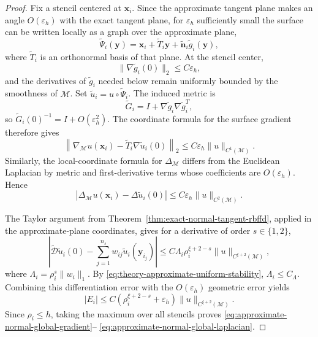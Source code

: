 \documentclass[10pt,a4paper]{amsart}
\begin{document}
\begin{proof}
Fix a stencil centered at \(\bm x_i\).  Since the approximate tangent plane
makes an angle \(O(\varepsilon_h)\) with the exact tangent plane, for
\(\varepsilon_h\) sufficiently small the surface can be written locally as a
graph over the approximate plane,
\[
  \widetilde\Psi_i(\bm y)
  =\bm x_i+\widetilde T_i\bm y
  +\widetilde{\bm n}_i\widetilde g_i(\bm y),
\]
where \(\widetilde T_i\) is an orthonormal basis of that plane.  At the stencil
center,
\[
  \|\nabla\widetilde g_i(0)\|_2\leq C\varepsilon_h,
\]
and the derivatives of \(\widetilde g_i\) needed below remain uniformly
bounded by the smoothness of \(\mathcal M\). Set \(\widetilde u_i=u\circ\widetilde\Psi_i\).  The induced metric is
\[
  \widetilde G_i
  =I+\nabla\widetilde g_i\nabla\widetilde g_i^T,
\]
so \(\widetilde G_i(0)^{-1}=I+O(\varepsilon_h^2)\).  The coordinate formula for
the surface gradient therefore gives
\[
  \left\|
    \nabla_{\mathcal M}u(\bm x_i)
    -\widetilde T_i\nabla\widetilde u_i(0)
  \right\|_2
  \leq C\varepsilon_h\|u\|_{C^1(\mathcal M)}.
\]
Similarly, the local-coordinate formula for \(\Delta_{\mathcal M}\) differs
from the Euclidean Laplacian by metric and first-derivative terms whose
coefficients are \(O(\varepsilon_h)\).  Hence
\[
  \left|
    \Delta_{\mathcal M}u(\bm x_i)
    -\Delta\widetilde u_i(0)
  \right|
  \leq C\varepsilon_h\|u\|_{C^2(\mathcal M)}.
\]

The Taylor argument from
Theorem~\ref{thm:exact-normal-tangent-rbffd}, applied in the approximate-plane
coordinates, gives for a derivative of order \(s\in\{1,2\}\),
\[
  \left|
    \widetilde{\mathcal D}\widetilde u_i(0)
    -\sum_{j=1}^{n_s}w_{ij}\widetilde u_i(\bm y_{i_j})
  \right|
  \leq
  C\Lambda_i\rho_i^{\xi+2-s}
  \|u\|_{C^{\xi+2}(\mathcal M)},
\]
where \(\Lambda_i=\rho_i^s\|w_i\|_1\).  By
\eqref{eq:theory-approximate-uniform-stability},
\(\Lambda_i\leq C_\Lambda\).  Combining this differentiation error with the
\(O(\varepsilon_h)\) geometric error yields
\[
  |E_i|
  \leq
  C\left(\rho_i^{\xi+2-s}+\varepsilon_h\right)
  \|u\|_{C^{\xi+2}(\mathcal M)}.
\]
Since \(\rho_i\leq h\), taking the maximum over all stencils proves
\eqref{eq:approximate-normal-global-gradient}--
\eqref{eq:approximate-normal-global-laplacian}.
\end{proof}
\end{document}
